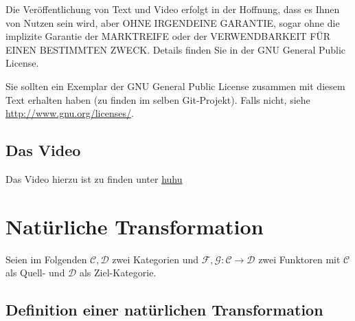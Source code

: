 \documentclass[a4paper]{amsart}
\theoremstyle{definition}
\begin{document}
Die Veröffentlichung von Text und Video erfolgt in der Hoffnung, dass es Ihnen von Nutzen sein wird, 
aber OHNE IRGENDEINE GARANTIE, sogar ohne die implizite Garantie der MARKTREIFE oder der 
VERWENDBARKEIT FÜR EINEN BESTIMMTEN ZWECK. Details finden Sie in der GNU General Public License.

Sie sollten ein Exemplar der GNU General Public License zusammen mit diesem Text erhalten haben 
(zu finden im selben Git-Projekt). 
Falls nicht, siehe \url{http://www.gnu.org/licenses/}.

\subsection*{Das Video}
Das Video hierzu ist zu finden unter 
{\tiny
   \url{huhu}
}

\section{Natürliche Transformation}
Seien im Folgenden $\mathcal{C,D}$ zwei Kategorien und $\mathcal F,\mathcal G \colon \mathcal C \to \mathcal D$ zwei Funktoren mit $\mathcal C$ als Quell- und $\mathcal D$ als Ziel-Kategorie.

\subsection{Definition einer natürlichen Transformation}


\end{document}
